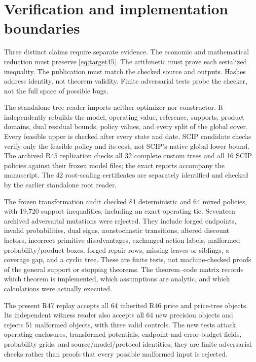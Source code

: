 \section{Verification and implementation boundaries}\label{sec:verification45}
Three distinct claims require separate evidence. The economic and mathematical reduction must preserve \eqref{eq:target45}. The arithmetic must prove each serialized inequality. The publication must match the checked source and outputs. Hashes address identity, not theorem validity. Finite adversarial tests probe the checker, not the full space of possible bugs.

The standalone tree reader imports neither optimizer nor constructor. It independently rebuilds the model, operating value, reference, supports, product domains, dual residual bounds, policy values, and every split of the global cover. Every feasible upper is checked after every state and date. SCIP candidate checks verify only the feasible policy and its cost, not SCIP's native global lower bound. The archived R45 replication checks all 32 complete custom trees and all 16 SCIP policies against their frozen model files; the exact reports accompany the manuscript. The 42 root-scaling certificates are separately identified and checked by the earlier standalone root reader.

The frozen transformation audit checked 81 deterministic and 64 mixed policies, with 19,720 support inequalities, including an exact operating tie. Seventeen archived adversarial mutations were rejected. They include forged endpoints, invalid probabilities, dual signs, nonstochastic transitions, altered discount factors, incorrect primitive disadvantages, exchanged action labels, malformed probability/product boxes, forged repair rows, missing leaves or siblings, a coverage gap, and a cyclic tree. These are finite tests, not machine-checked proofs of the general support or stopping theorems. The theorem--code matrix records which theorem is implemented, which assumptions are analytic, and which calculations were actually executed.

The present R47 replay accepts all 64 inherited R46 price and price-tree objects. Its independent witness reader also accepts all 64 new precision objects and rejects 51 malformed objects, with three valid controls. The new tests attack operating enclosures, transformed potentials, endpoint and error-budget fields, probability grids, and source/model/protocol identities; they are finite adversarial checks rather than proofs that every possible malformed input is rejected.

